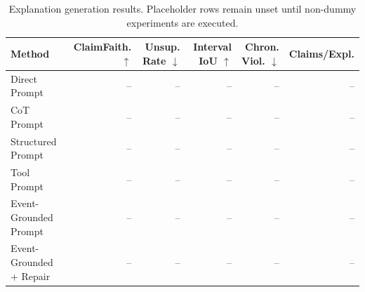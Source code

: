 \begin{table}[t]
\centering
\small
\begin{tabular}{lrrrrr}
\toprule
Method & ClaimFaith. $\uparrow$ & Unsup. Rate $\downarrow$ & Interval IoU $\uparrow$ & Chron. Viol. $\downarrow$ & Claims/Expl. \\
\midrule
Direct Prompt & -- & -- & -- & -- & -- \\
CoT Prompt & -- & -- & -- & -- & -- \\
Structured Prompt & -- & -- & -- & -- & -- \\
Tool Prompt & -- & -- & -- & -- & -- \\
Event-Grounded Prompt & -- & -- & -- & -- & -- \\
Event-Grounded + Repair & -- & -- & -- & -- & -- \\
\bottomrule
\end{tabular}
\caption{Explanation generation results. Placeholder rows remain unset until non-dummy experiments are executed.}
\label{tab:generation}
\end{table}

